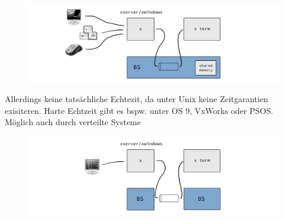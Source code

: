 			$\;$
			\begin{figure}[phbt]
				\includegraphics[width=\textwidth]{workfiles/v5_2}
			\end{figure}

			Allerdings keine tatsächliche Echtezit, da unter Unix keine Zeitgarantien exisiteren.
			Harte Echtzeit gibt es bspw. unter OS 9, VxWorks oder PSOS.\\
			Möglich auch durch verteilte Systeme

			\begin{figure}[hbtp]
				\includegraphics[width=\textwidth]{workfiles/v5_3}
			\end{figure}
		

